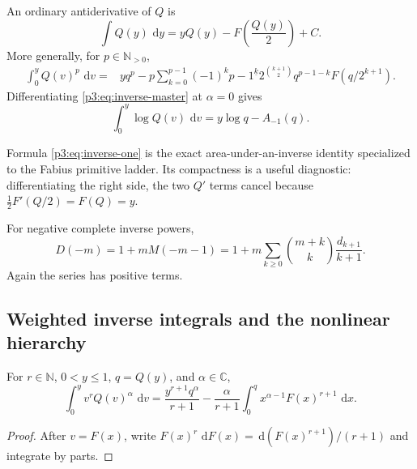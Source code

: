 \documentclass[11pt,oneside]{article}
\theoremstyle{definition}
\theoremstyle{remark}
\newcommand{\C}{\mathbb C}
\newcommand{\N}{\mathbb N}
\newcommand{\dd}{\,\mathrm d}
\newcommand{\fall}[2]{#1^{\underline{#2}}}
\newcommand{\1}{\mathbf 1}
\begin{document}
\begin{corollary}
\label{p3:cor:inverse-one}
An ordinary antiderivative of $Q$ is
\begin{equation}
 \boxed{
 \int Q(y)\,\dd y
 =yQ(y)-F\!\left(\frac{Q(y)}2\right)+C.}
 \label{p3:eq:inverse-one}
\end{equation}
More generally, for $p\in\N_{>0}$,
\begin{align}
 \int_0^yQ(v)^p\,\dd v
 ={}&yq^p
 -p\sum_{k=0}^{p-1}(-1)^k\fall{p-1}k
 2^{\binom{k+1}{2}}q^{p-1-k}F(q/2^{k+1}).                   \label{p3:eq:inverse-integer}
\end{align}
Differentiating \eqref{p3:eq:inverse-master} at $\alpha=0$ gives
\begin{equation}
 \int_0^y\log Q(v)\,\dd v=y\log q-A_{-1}(q).                \label{p3:eq:inverse-log}
\end{equation}
\end{corollary}

Formula \eqref{p3:eq:inverse-one} is the exact area-under-an-inverse identity specialized to the
Fabius primitive ladder.  Its compactness is a useful diagnostic: differentiating the right
side, the two $Q'$ terms cancel because
$\tfrac12F'(Q/2)=F(Q)=y$.

For negative complete inverse powers,
\begin{equation}
 D(-m)=1+mM(-m-1)
 =1+m\sum_{k\ge0}\binom{m+k}{k}\frac{d_{k+1}}{k+1}.           \label{p3:eq:inverse-negative-complete}
\end{equation}
Again the series has positive terms.

\subsection{Weighted inverse integrals and the nonlinear hierarchy}

\begin{proposition}
\label{p3:prop:weighted-inverse}
For $r\in\N$, $0<y\le1$, $q=Q(y)$, and $\alpha\in\C$,
\begin{equation}
 \boxed{
 \int_0^yv^rQ(v)^\alpha\,\dd v
 =\frac{y^{r+1}q^\alpha}{r+1}
 -\frac{\alpha}{r+1}\int_0^qx^{\alpha-1}F(x)^{r+1}\,\dd x.}
 \label{p3:eq:weighted-inverse}
\end{equation}
\end{proposition}

\begin{proof}
After $v=F(x)$, write $F(x)^r\,\dd F(x)=\dd(F(x)^{r+1})/(r+1)$ and integrate by parts.
\end{proof}
\end{document}
